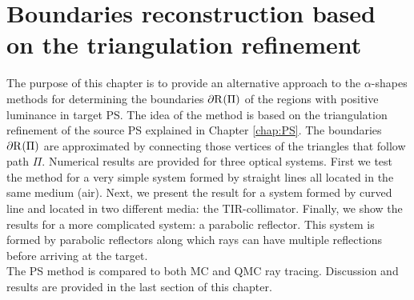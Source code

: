\chapter{Boundaries reconstruction based on the triangulation refinement}\label{chap:triangulation}
The purpose of this chapter is to provide an alternative approach to the $\alpha$-shapes methods for determining the boundaries $\partial \mbox{$\textup{R}_{\textit{}}$}(\Pi)$ of the regions with positive luminance in target PS. The idea of the method is based on the triangulation refinement of the source PS explained in Chapter \ref{chap:PS}. The boundaries $\partial \mbox{$\textup{R}_{\textit{}}$}(\Pi)$ are approximated by connecting those vertices of the triangles that follow path $\Pi$. Numerical results are provided for three optical systems. First we test the method for a very simple system formed by straight lines all located in the same medium (air). Next, we present the result for a system formed by curved line and located in two different media: the TIR-collimator. Finally, we show the results for a more complicated system: a parabolic reflector. This system is formed by parabolic reflectors along which rays can have multiple reflections before arriving at the target.\\ \indent The PS method is compared to both MC and QMC ray tracing. Discussion and results are provided in the last section of this chapter.
